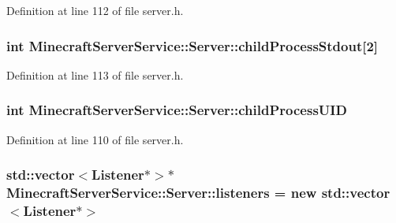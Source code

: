 Definition at line 112 of file server.\+h.

\subsubsection[{\texorpdfstring{child\+Process\+Stdout}{childProcessStdout}}]{\setlength{\rightskip}{0pt plus 5cm}int Minecraft\+Server\+Service\+::\+Server\+::child\+Process\+Stdout\mbox{[}2\mbox{]}\hspace{0.3cm}{\ttfamily [protected]}}\hypertarget{class_minecraft_server_service_1_1_server_abb0ccd5070cc03476fc00e2e7674de6a}{}\label{class_minecraft_server_service_1_1_server_abb0ccd5070cc03476fc00e2e7674de6a}


Definition at line 113 of file server.\+h.

\subsubsection[{\texorpdfstring{child\+Process\+U\+ID}{childProcessUID}}]{\setlength{\rightskip}{0pt plus 5cm}int Minecraft\+Server\+Service\+::\+Server\+::child\+Process\+U\+ID\hspace{0.3cm}{\ttfamily [protected]}}\hypertarget{class_minecraft_server_service_1_1_server_af2c725b65183545aee7228aae35b6967}{}\label{class_minecraft_server_service_1_1_server_af2c725b65183545aee7228aae35b6967}


Definition at line 110 of file server.\+h.

\subsubsection[{\texorpdfstring{listeners}{listeners}}]{\setlength{\rightskip}{0pt plus 5cm}std\+::vector$<${\bf Listener}$\ast$$>$$\ast$ Minecraft\+Server\+Service\+::\+Server\+::listeners = new std\+::vector$<${\bf Listener}$\ast$$>$\hspace{0.3cm}{\ttfamily [protected]}}\hypertarget{class_minecraft_server_service_1_1_server_a51c6dda2196eb9ee8ff671deacb66dae}{}\label{class_minecraft_server_service_1_1_server_a51c6dda2196eb9ee8ff671deacb66dae}


